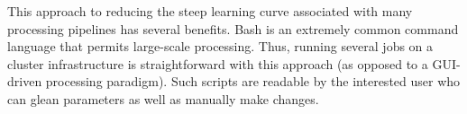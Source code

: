 \documentclass[11pt,]{article}
\newenvironment{Shaded}{\begin{snugshade}}{\end{snugshade}}
\newcommand{\KeywordTok}[1]{\textcolor[rgb]{0.13,0.29,0.53}{\textbf{{#1}}}}
\newcommand{\CommentTok}[1]{\textcolor[rgb]{0.56,0.35,0.01}{\textit{{#1}}}}
\newcommand{\NormalTok}[1]{{#1}}
\begin{document}
\begin{Shaded}
\end{Shaded}

This approach to reducing the steep learning curve associated with many
processing pipelines has several benefits. Bash is an extremely common
command language that permits large-scale processing. Thus, running
several jobs on a cluster infrastructure is straightforward with this
approach (as opposed to a GUI-driven processing paradigm). Such scripts
are readable by the interested user who can glean parameters as well as
manually make changes.
\end{document}
